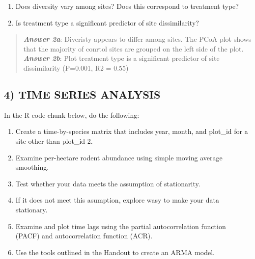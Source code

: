 \documentclass[]{article}
\providecommand{\tightlist}{%
  \setlength{\itemsep}{0pt}\setlength{\parskip}{0pt}}
\begin{document}
\begin{enumerate}
\def\labelenumi{\alph{enumi}.}
\tightlist
\item
  Does diversity vary among sites? Does this correspond to treatment
  type?
\item
  Is treatment type a significant predictor of site dissimilarity?
\end{enumerate}

\begin{quote}
\textbf{\emph{Answer 2a}}: Diveristy appears to differ among sites. The
PCoA plot shows that the majority of conrtol sites are grouped on the
left side of the plot. \textbf{\emph{Answer 2b}}: Plot treatment type is
a significant predictor of site dissimilarity (P=0.001, R2 = 0.55)
\end{quote}

\subsection{4) TIME SERIES ANALYSIS}\label{time-series-analysis}

In the R code chunk below, do the following:

\begin{enumerate}
\def\labelenumi{\arabic{enumi}.}
\tightlist
\item
  Create a time-by-species matrix that includes year, month, and
  plot\_id for a site other than plot\_id 2.
\item
  Examine per-hectare rodent abundance using simple moving average
  smoothing.
\item
  Test whether your data meets the assumption of stationarity.
\item
  If it does not meet this asumption, explore wasy to make your data
  stationary.
\item
  Examine and plot time lags using the partial autocorrelation function
  (PACF) and autocorrelation function (ACR).
\item
  Use the tools outlined in the Handout to create an ARMA model.
\end{enumerate}
\end{document}
